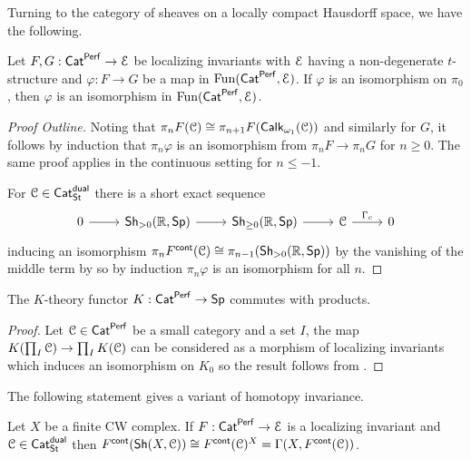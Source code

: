 Turning to the category of sheaves on a locally compact Hausdorff space, we have the following.
\begin{theorem}\label{thm: criterion for isomorphism of localizing invariants}
    Let $F,G:\mathsf{Cat}^{\mathsf{Perf}}\to\EuScript{E}$ be localizing invariants with $\EuScript{E}$ having a non-degenerate $t$-structure and $\varphi: F\to G$ be a map in $\mathrm{Fun}(\mathsf{Cat}^{\mathsf{Perf}},
    \EuScript{E})$. If $\varphi$ is an isomorphism on $\pi_{0}$, then $\varphi$ is an isomorphism in $\mathrm{Fun}(\mathsf{Cat}^{\mathsf{Perf}},\EuScript{E})$.
\end{theorem}
\begin{proof}[Proof Outline]
    Noting that $\pi_{n}F(\EuScript{C})\cong\pi_{n+1}F(\mathsf{Calk}_{\omega_{1}}(\EuScript{C}))$ and similarly for $G$, it follows by induction that $\pi_{n}\varphi$ is an isomorphism from $\pi_{n}F\to\pi_{n}G$ for $n\geq0$. The same proof applies in the continuous setting for $n\leq-1$. 

    For $\EuScript{C}\in\mathsf{Cat}^{\mathsf{dual}}_{\mathsf{St}}$ there is a short exact sequence 
    $$%
    \begin{tikzcd}
        0 & {\Sh_{>0}(\RR,\Sp)} & {\Sh_{\geq0}(\RR,\Sp)} & \Cscr & 0
        \arrow[from=1-1, to=1-2]
        \arrow[from=1-2, to=1-3]
        \arrow[from=1-3, to=1-4]
        \arrow["{\Gamma_{c}}", from=1-4, to=1-5]
    \end{tikzcd}$$
    inducing an isomorphism $\pi_{n}F^{\mathsf{cont}}(\EuScript{C})\cong\pi_{n-1}(\mathsf{Sh}_{>0}(\mathbb{R},\mathsf{Sp}))$ by the vanishing of the middle term by  so by induction $\pi_{n}\varphi$ is an isomorphism for all $n$. 
\end{proof}
\begin{corollary}
    The $K$-theory functor $K:\mathsf{Cat}^{\mathsf{Perf}}\to\mathsf{Sp}$ commutes with products. 
\end{corollary}
\begin{proof}
    Let $\EuScript{C}\in\mathsf{Cat}^{\mathsf{Perf}}$ be a small category and a set $I$, the map $K(\prod_{I}\EuScript{C})\to\prod_{I}K(\EuScript{C})$ can be considered as a morphism of localizing invariants which induces an isomorphism on $K_{0}$ so the result follows from .
\end{proof}
The following statement gives a variant of homotopy invariance. 
\begin{theorem}\label{thm: characterizations of localizing invariants}
    Let $X$ be a finite CW complex. If $F:\mathsf{Cat}^{\mathsf{Perf}}\to\EuScript{E}$ is a localizing invariant and $\EuScript{C}\in\mathsf{Cat}^{\mathsf{dual}}_{\mathsf{St}}$ then $F^{\mathsf{cont}}(\mathsf{Sh}(X,\EuScript{C}))\cong F^{\mathsf{cont}}(\EuScript{C})^{X}=\Gamma(X,F^{\mathsf{cont}}(\EuScript{C}))$. 
\end{theorem}